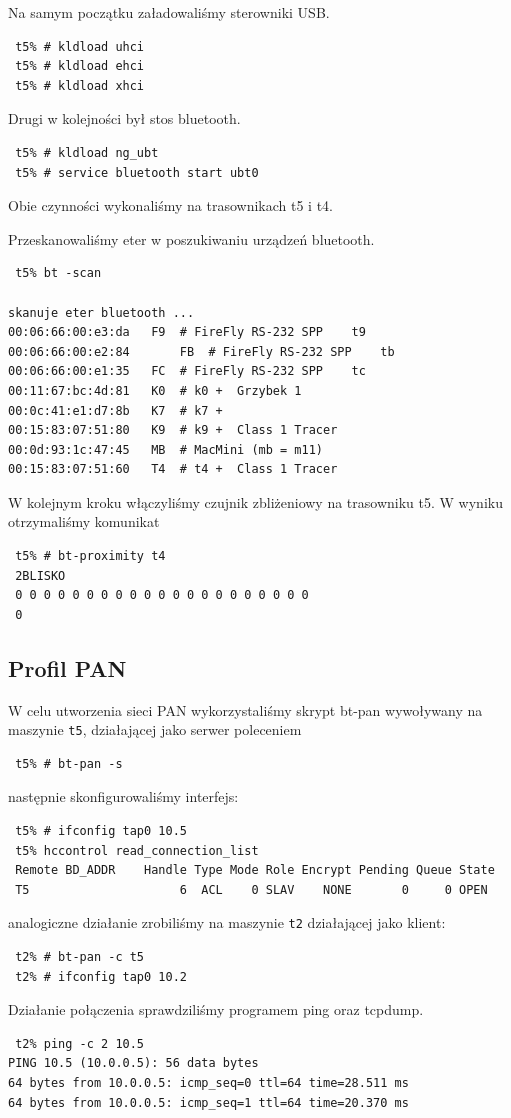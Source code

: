 \documentclass[a4paper,11pt,notitlepage]{article}
\begin{document}
Na samym początku załadowaliśmy sterowniki USB.
\begin{verbatim}
 t5% # kldload uhci
 t5% # kldload ehci
 t5% # kldload xhci
\end{verbatim}
Drugi w kolejności był stos bluetooth.
\begin{verbatim}
 t5% # kldload ng_ubt
 t5% # service bluetooth start ubt0
\end{verbatim}
Obie czynności wykonaliśmy na trasownikach t5 i t4.

Przeskanowaliśmy eter w poszukiwaniu urządzeń bluetooth.
\begin{verbatim}
 t5% bt -scan

skanuje eter bluetooth ...
00:06:66:00:e3:da	F9	# FireFly RS-232 SPP 	t9
00:06:66:00:e2:84       FB	# FireFly RS-232 SPP 	tb
00:06:66:00:e1:35	FC	# FireFly RS-232 SPP	tc
00:11:67:bc:4d:81	K0	# k0 +	Grzybek 1
00:0c:41:e1:d7:8b	K7	# k7 +
00:15:83:07:51:80	K9	# k9 +	Class 1 Tracer
00:0d:93:1c:47:45	MB	# MacMini (mb = m11)
00:15:83:07:51:60	T4	# t4 +	Class 1 Tracer
\end{verbatim}

W kolejnym kroku włączyliśmy czujnik zbliżeniowy na trasowniku t5.
W wyniku otrzymaliśmy komunikat
\begin{verbatim}
 t5% # bt-proximity t4
 2BLISKO
 0 0 0 0 0 0 0 0 0 0 0 0 0 0 0 0 0 0 0 0 0
 0
\end{verbatim}

\subsection{Profil PAN}

W celu utworzenia sieci PAN wykorzystaliśmy skrypt bt-pan wywoływany na maszynie \verb+t5+, działającej jako serwer poleceniem 
\begin{verbatim}
 t5% # bt-pan -s
\end{verbatim}
następnie skonfigurowaliśmy interfejs:
\begin{verbatim}
 t5% # ifconfig tap0 10.5
 t5% hccontrol read_connection_list
 Remote BD_ADDR    Handle Type Mode Role Encrypt Pending Queue State
 T5                     6  ACL    0 SLAV    NONE       0     0 OPEN
\end{verbatim}
analogiczne działanie zrobiliśmy na maszynie \verb+t2+ działającej jako klient:
\begin{verbatim}
 t2% # bt-pan -c t5
 t2% # ifconfig tap0 10.2
\end{verbatim}
Działanie połączenia sprawdziliśmy programem ping oraz tcpdump.
\begin{verbatim}
 t2% ping -c 2 10.5
PING 10.5 (10.0.0.5): 56 data bytes
64 bytes from 10.0.0.5: icmp_seq=0 ttl=64 time=28.511 ms
64 bytes from 10.0.0.5: icmp_seq=1 ttl=64 time=20.370 ms
\end{verbatim}
\end{document}
